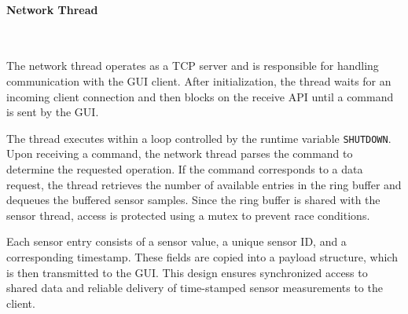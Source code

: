 \documentclass{article}
\begin{document}
\paragraph{Network Thread}\

The network thread operates as a TCP server and is responsible for handling communication 
with the GUI client. After initialization, the thread waits for an incoming client 
connection and then blocks on the receive API until a command is sent by the GUI.

The thread executes within a loop controlled by the runtime variable \texttt{SHUTDOWN}. 
Upon receiving a command, the network thread parses the command to determine the requested 
operation. If the command corresponds to a data request, the thread retrieves the number 
of available entries in the ring buffer and dequeues the buffered sensor samples. Since 
the ring buffer is shared with the sensor thread, access is protected using a mutex to 
prevent race conditions.

Each sensor entry consists of a sensor value, a unique sensor ID, and a corresponding 
timestamp. These fields are copied into a payload structure, which is then transmitted 
to the GUI. This design ensures synchronized access to shared data and reliable delivery 
of time-stamped sensor measurements to the client.
\end{document}

